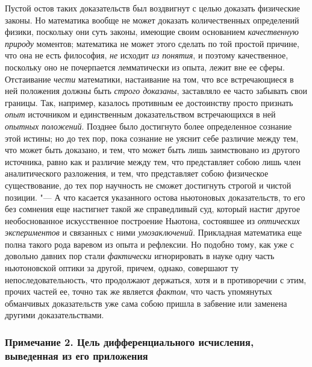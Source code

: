 Пустой остов таких доказательств был воздвигнут с целью доказать физические
законы. Но математика вообще не может доказать количественных определений
физики, поскольку они суть законы, имеющие своим основанием
{\em качественную природу} моментов; математика не
может этого сделать по той простой причине, что она не есть философия,
{\em не} исходит {\em из понятия},
и поэтому качественное, поскольку оно не почерпается лемматически из опыта,
лежит вне ее сферы. Отстаивание {\em чести} математики,
настаивание на том, что все встречающиеся в ней положения должны быть
{\em строго доказаны}, заставляло ее часто забывать
свои границы. Так, например, казалось противным ее достоинству просто
признать {\em опыт} источником и единственным
доказательством встречающихся в ней {\em опытных
}{\em положений}. Позднее было достигнуто более
определенное сознание этой истины; но до тех пор, пока сознание не уяснит
себе различие между тем, что может быть доказано, и тем, что может быть
лишь заимствовано из другого источника, равно как и различие между тем, что
представляет собою лишь член аналитического разложения, и тем, что
представляет собою физическое существование, до тех пор научность не сможет
достигнуть строгой и чистой позиции. "--- А что касается указанного остова
ньютоновых доказательств, то его без сомнения еще настигнет такой же
справедливый суд, который настиг другое необоснованное искусственное
построение Ньютона, состоявшее из {\em оптических
экспериментов} и связанных с ними {\em умозаключений}.
Прикладная математика еще полна такого рода варевом из опыта и рефлексии.
Но подобно тому, как уже с довольно давних пор стали
{\em фактически} игнорировать в науке одну часть
ньютоновской оптики за другой, причем, однако, совершают ту
непоследовательность, что продолжают держаться, хотя и в противоречии с
этим, прочих частей ее, точно так же является {\em фактом}, что часть
упомянутых обманчивых доказательств уже сама собою пришла
в забвение или заменена другими доказательствами.

\subsubsection[Примечание 2. Цель дифференциального исчисления, выведенная из его приложения]
{Примечание 2. Цель дифференциального исчисления, выведенная из его приложения}


